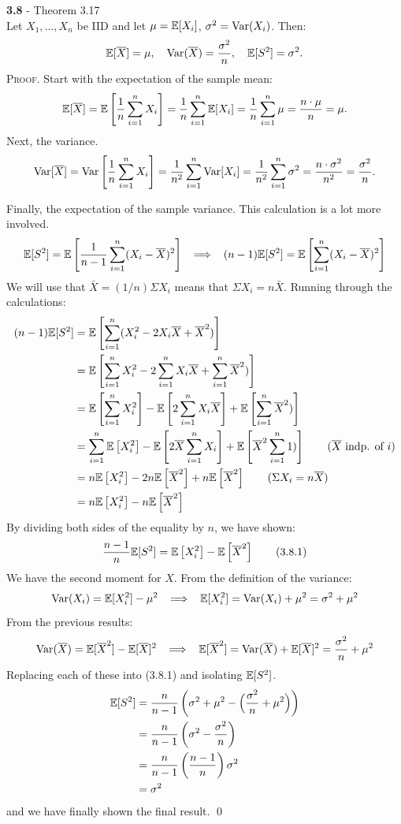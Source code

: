 \bigskip\noindent
\textbf{3.8} - Theorem 3.17\\  %
Let $X_1,\ldots, X_n$ be IID and let $\mu = \mathbb{E}[X_i]$, $\sigma^2 = \text{Var}(X_i)$.
Then:
$$
\mathbb{E}[\overline{X}] = \mu,\quad
\text{Var}(\overline{X}) = \frac{\sigma^2}{n},\quad
\mathbb{E}[S^2] = \sigma^2.
$$
\textsc{Proof}. Start with the expectation of the sample mean:
$$
\mathbb{E}[\overline{X}] = \mathbb{E}\left[\frac{1}{n}\sum_{i=1}^n X_i\right] = \frac{1}{n}\sum_{i=1}^n\mathbb{E}[X_i]
= \frac{1}{n}\sum_{i=1}^n \mu = \frac{n\cdot\mu}{n} = \mu.
$$
Next, the variance.
$$
\text{Var}[\overline{X}] = \text{Var}\left[\frac{1}{n}\sum_{i=1}^n X_i\right] = \frac{1}{n^2}\sum_{i=1}^n\text{Var}[X_i]
= \frac{1}{n^2}\sum_{i=1}^n \sigma^2 = \frac{n\cdot\sigma^2}{n^2} =\frac{\sigma^2}{n}.
$$

\newpage\noindent
Finally, the expectation of the sample variance. This calculation is a lot more involved.
$$
\mathbb{E}[S^2] = \mathbb{E}\left[\frac{1}{n-1}\sum_{i=1}^n (X_i - \overline{X})^2\right]
\;\;\implies\;\;
(n-1)\mathbb{E}[S^2] = \mathbb{E}\left[\sum_{i=1}^n (X_i - \overline{X})^2\right]
$$
We will use that $\bar{X} = (1/n)\Sigma X_i$ means that $\Sigma X_i = n\bar{X}$.
Running through the calculations:
\begin{align*}
    (n-1)\E[S^2] &= \E\left[\sum_{i=1}^n (X_i^2 - 2X_i\bar{X} + \bar{X}^2)\right] \\
    &= \E\left[\sum_{i=1}^n X_i^2 - 2 \sum_{i=1}^n X_i\bar{X} + \sum_{i=1}^n\bar{X}^2)\right] \\
    &= \E\left[\sum_{i=1}^n X_i^2\right] - \E\left[2 \sum_{i=1}^n X_i\bar{X}\right] + \E\left[\sum_{i=1}^n\bar{X}^2)\right] \\
    &= \sum_{i=1}^n \E\left[X_i^2\right] - \E\left[2 \bar{X}\sum_{i=1}^n X_i\right] + \E\left[\bar{X}^2\sum_{i=1}^n 1)\right] \tag{$\bar{X}$ indp. of $i$}\\
    &= n\E\left[X_i^2\right] - 2n\E\left[\bar{X}^2\right] + n\E\left[\bar{X}^2\right] \tag{$\Sigma X_i = n\bar{X}$}\\
    &= n\E\left[X_i^2\right] - n\E\left[\bar{X}^2\right]
\end{align*}
By dividing both sides of the equality by $n$, we have shown:
\[
\frac{n-1}{n}\mathbb{E}[S^2] = \mathbb{E}\left[X_i^2\right] - \mathbb{E}\left[\overline{X}^2\right]
\tag{3.8.1}
\]
We have the second moment for $X$. From the definition of the variance:
$$
\text{Var}(X_i) = \mathbb{E}[X_i^2] - \mu^2 \;\;\implies\;\; \mathbb{E}[X_i^2] = \text{Var}(X_i) + \mu^2 = \sigma^2 + \mu^2
$$
From the previous results:
$$
\text{Var}(\overline{X}) = \mathbb{E}[\overline{X}^2] - \mathbb{E}[\overline{X}]^2 \;\;\implies\;\;
\mathbb{E}[\overline{X}^2] = \text{Var}(\overline{X}) + \mathbb{E}[\overline{X}]^2 = \frac{\sigma^2}{n} + \mu^2
$$
Replacing each of these into (3.8.1) and isolating $\mathbb{E}[S^2]$.
\begin{align*}
    \mathbb{E}[S^2] &= \frac{n}{n-1}\left(\sigma^2 + \mu^2 - \Big(\frac{\sigma^2}{n} + \mu^2\Big)\right) \\
    &= \frac{n}{n-1}\left(\sigma^2 - \frac{\sigma^2}{n}\right) \\
    &= \frac{n}{n-1}\left(\frac{n-1}{n}\right)\sigma^2 \\
    &= \sigma^2
\end{align*}
and we have finally shown the final result. \qed


